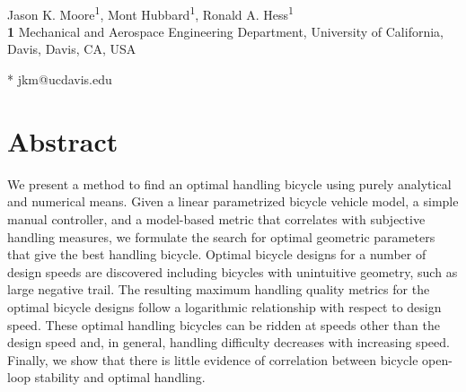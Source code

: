 \documentclass[10pt,letterpaper]{article}
\begin{document}
\vspace*{0.2in}

\begin{flushleft}
{\Large
\textbf{} %
}
\newline
\\
Jason K. Moore\textsuperscript{1},
Mont Hubbard\textsuperscript{1},
Ronald A. Hess\textsuperscript{1}
\\
\bigskip
\textbf{1} Mechanical and Aerospace Engineering Department, University of
California, Davis, Davis, CA, USA
\\
\bigskip

* jkm@ucdavis.edu

\end{flushleft}

\section*{Abstract}
%
We present a method to find an optimal handling bicycle using purely analytical
and numerical means. Given a linear parametrized bicycle vehicle model, a
simple manual controller, and a model-based metric that correlates with
subjective handling measures, we formulate the search for optimal geometric
parameters that give the best handling bicycle. Optimal bicycle designs for a
number of design speeds are discovered including bicycles with unintuitive
geometry, such as large negative trail. The resulting maximum handling quality
metrics for the optimal bicycle designs follow a logarithmic relationship with
respect to design speed. These optimal handling bicycles can be ridden at
speeds other than the design speed and, in general, handling difficulty
decreases with increasing speed. Finally, we show that there is little evidence
of correlation between bicycle open-loop stability and optimal handling.

\linenumbers
\end{document}
